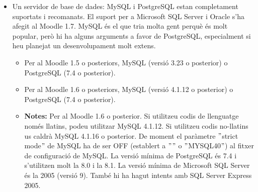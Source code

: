 \documentclass[a4paper]{report}  %
\begin{document}
\begin{itemize}
\begin{itemize}
\begin{itemize}
			\end{itemize}
		\item Un servidor de base de dades: MySQL i PostgreSQL estan completament suportats i recomanats. El suport per a Microsoft SQL Server i Oracle s'ha afegit al Moodle 1.7. MySQL és el que tria molta gent perquè és molt popular, però hi ha alguns arguments a favor de PostgreSQL, especialment si heu planejat un desenvolupament molt extens. 
			\begin{itemize}
			\item Per al Moodle 1.5 o posteriors, MySQL (versió 3.23 o posterior) o PostgreSQL (7.4 o posterior). 
			\item Per al Moodle 1.6 o posteriors, MySQL (versió 4.1.12 o posterior) o PostgreSQL (7.4 o posterior). 
			\item \textbf{Notes:} Per al Moodle 1.6 o posterior. Si utilitzeu codis de llenguatge només llatins, podeu utilitzar MySQL 4.1.12. Si utilitzeu codis no-llatins us caldrà MySQL 4.1.16 o posterior. De moment el paràmetre $"$strict mode$"$ de MySQL ha de ser OFF (establert a $"$$"$ o $"$MYSQL40$"$) al fitxer de configuració de MySQL. La versió mínima de PostgreSQL és 7.4 i s'utilitzen molt la 8.0 i la 8.1. La versió mínima de Microsoft SQL Server és la 2005 (versió 9). També hi ha hagut intents amb SQL Server Express 2005. 
			\end{itemize}
 	\end{itemize}
 \end{itemize}
\end{document}
